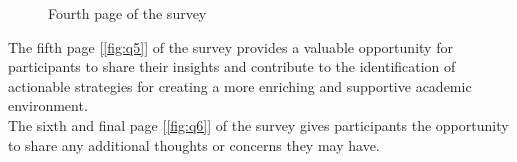 \documentclass[11pt]{report}
\begin{document}
\begin{figure}[h!]
    \centering
    \hfill
\end{figure}
\begin{figure}[h!]\ContinuedFloat
    \centering
    \caption{Fourth page of the survey}
    \label{fig:q4}
\end{figure}
\FloatBarrier
\noindent The fifth page [\ref{fig:q5}] of the survey provides a valuable opportunity for participants to share their insights and contribute to the identification of actionable strategies for creating a more enriching and supportive academic environment.\vspace{5mm} \\
The sixth and final page [\ref{fig:q6}] of the survey gives participants the opportunity to share any additional thoughts or concerns they may have.
\end{document}
